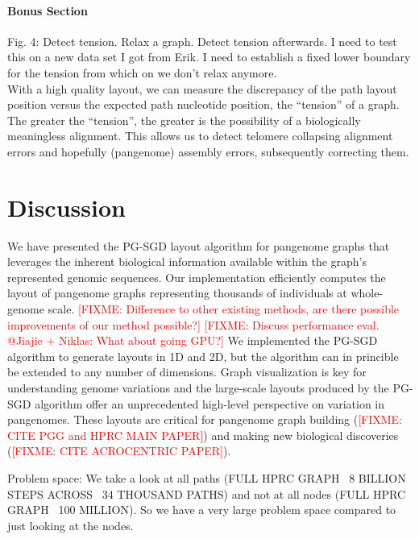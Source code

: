 \documentclass{bioinfo}
\theoremstyle{definition}
\newcommand{\red}[1]{{\textcolor{Red}{#1}}}
\newcommand{\FIXME}[1]{\red{[FIXME: #1]}}
\begin{document}
    \paragraph{Bonus Section}
    Fig. 4: Detect tension. Relax a graph. Detect tension afterwards.
    I need to test this on a new data set I got from Erik.
    I need to establish a fixed lower boundary for the tension from which on we don't relax anymore. \\
    With a high quality layout, we can measure the discrepancy of the path layout position versus the expected path nucleotide position, the “tension” of a graph.
    The greater the “tension”, the greater is the possibility of a biologically meaningless alignment.
    This allows us to detect telomere collapsing alignment errors and hopefully (pangenome) assembly errors, subsequently correcting them.
    
    \fi


	\section{Discussion}
	\label{sec:discussion}
	
	We have presented the PG-SGD layout algorithm for pangenome graphs that leverages the inherent biological information available within the graph's represented genomic sequences.
	Our implementation efficiently computes the layout of pangenome graphs representing thousands of individuals at whole-genome scale.
	\FIXME{Difference to other existing methods, are there possible improvements of our method possible?}
	\FIXME{Discuss performance eval. @Jiajie + Niklas: What about going GPU?}
	We implemented the PG-SGD algorithm to generate layouts in 1D and 2D, but the algorithm can in princible be extended to any number of dimensions.
	Graph visualization is key for understanding genome variations and the large-scale layouts produced by the PG-SGD algorithm offer an unprecedented 
	high-level perspective on variation in pangenomes. These layouts are critical for pangenome graph building (\FIXME{CITE PGG and HPRC MAIN PAPER}) and 
	making new biological discoveries (\FIXME{CITE ACROCENTRIC PAPER}).
	
	Problem space: We take a look at all paths (FULL HPRC GRAPH ~8 BILLION STEPS ACROSS ~34 THOUSAND PATHS) and not at all nodes (FULL HPRC GRAPH ~100 MILLION). So we have a very large problem space compared to just looking at the nodes.
	
\end{document}
